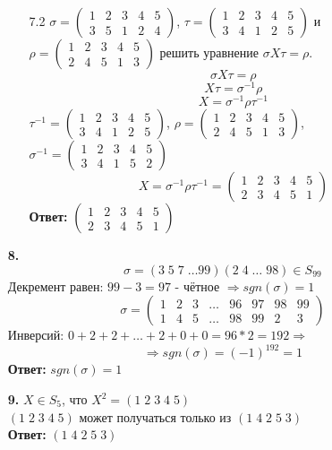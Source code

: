 \documentclass[a4paper]{article}
\newcommand{\mat}[1]{\begin{pmatrix} #1 \end{pmatrix}}
\renewcommand{\r}{\Rightarrow}
\begin{document}
\begin{enumerate}
\begin{enumerate}
                  \item[7.2]
                        $\sigma = \begin{pmatrix}1 & 2 & 3 & 4 & 5\\3 & 5 & 1 & 2 & 4\end{pmatrix}$,
                        $\tau = \begin{pmatrix}1 & 2 & 3 & 4 & 5\\3 & 4 & 1 & 2 & 5\end{pmatrix}$ и
                        $\rho = \begin{pmatrix}1 & 2 & 3 & 4 & 5\\2 & 4 & 5 & 1 & 3\end{pmatrix}$ решить уравнение $\sigma X \tau = \rho$.
                        $$\sigma X \tau = \rho$$
                        $$X \tau =\sigma^{-1} \rho$$
                        $$X =\sigma^{-1} \rho \tau^{-1}$$
                        $\tau^{-1} = \begin{pmatrix}1 & 2 & 3 & 4 & 5\\3 & 4 & 1 & 2 & 5\end{pmatrix}$,
                        $\rho = \begin{pmatrix}1 & 2 & 3 & 4 & 5\\2 & 4 & 5 & 1 & 3\end{pmatrix}$,
                        $\sigma^{-1} = \begin{pmatrix}1 & 2 & 3 & 4 & 5\\3 & 4 & 1 & 5 & 2\end{pmatrix}$
                        $$X =\sigma^{-1} \rho \tau^{-1} = \mat{1 & 2 & 3 & 4 & 5 \\ 2 & 3 & 4 & 5 & 1}$$
                        \textbf{Ответ: } $\mat{1 & 2 & 3 & 4 & 5 \\ 2 & 3 & 4 & 5 & 1}$

            \end{enumerate}

      \item[\textbf{8.}]
            $$\sigma = (3 \; 5 \; 7 \; \ldots 99)(2 \; 4 \; \ldots \; 98) \in S_{99}$$
            Декремент равен: $99 - 3 = 97$ - чётное $\r sgn(\sigma) = 1$
            $$\sigma = \mat{1 & 2 & 3 & \dots & 96 & 97 & 98 & 99 \\ 1 & 4 & 5 & \dots & 98 & 99 & 2 & 3}$$
            Инверсий: $0 + 2 + 2 + \dots + 2 + 0 + 0 = 96*2 = 192 \r$
            $$\r sgn(\sigma) = (-1)^{192} = 1$$
            \textbf{Ответ: } $sgn(\sigma) = 1$

      \item[\textbf{9.}]
            $X \in S_5$, что $X^2 = (1 \; 2 \; 3 \; 4 \; 5)$\\
            $(1 \; 2 \; 3 \; 4 \; 5)$ может получаться только из $(1 \; 4 \; 2 \; 5 \; 3)$\\
            \textbf{Ответ: } $(1 \; 4 \; 2 \; 5 \; 3)$



\end{enumerate}
\end{document}
